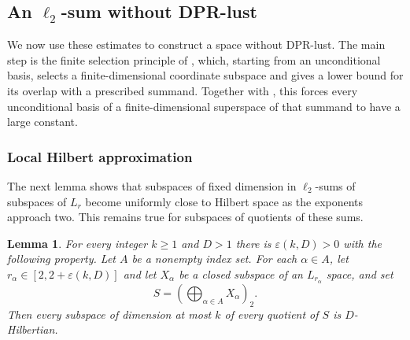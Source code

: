 \documentclass[11pt,a4paper,reqno]{amsart}
\newtheorem{lemma}[lemma]{Lemma}
\theoremstyle{definition}
\numberwithin{equation}{section}
\begin{document}
\subsection{An \texorpdfstring{$\ell_2$}{ell2}-sum without DPR-lust}
\label{sec:infinite-sum}

We now use these estimates to construct a space without DPR-lust. The main step is the finite selection principle of , which, starting from an unconditional basis, selects a finite-dimensional coordinate subspace and gives a lower bound for its overlap with a prescribed summand. Together with , this forces every unconditional basis of a finite-dimensional superspace of that summand to have a large constant.

\subsubsection{Local Hilbert approximation}

The next lemma shows that subspaces of fixed dimension in $\ell_2$-sums of subspaces of $L_r$ become uniformly close to Hilbert space as the exponents approach two. This remains true for subspaces of quotients of these sums.

\begin{lemma}\label{lem:local-hilbert}
For every integer $k\geq1$ and $D>1$ there is $\varepsilon(k,D)>0$ with the following property. Let $A$ be a nonempty index set. For each $\alpha\in A$, let $r_\alpha\in[2,2+\varepsilon(k,D)]$ and let $X_\alpha$ be a closed subspace of an $L_{r_\alpha}$ space, and set
\begin{equation*}
    S=\left(\bigoplus_{\alpha\in A}X_{\alpha}\right)_2.
\end{equation*}
Then every subspace of dimension at most $k$ of every quotient of $S$ is $D$-Hilbertian.
\end{lemma}
\end{document}
